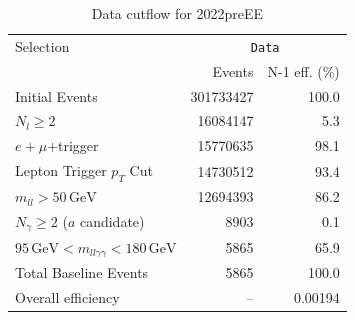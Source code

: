 \begin{table}[htbp]
\centering
\caption{Data cutflow for 2022preEE}
\label{tab:cutflow-data-2022preee}
\footnotesize
\begin{tabular}{lrr}
\hline
Selection & \multicolumn{2}{c}{\texttt{Data}} \\
 & Events & N-1 eff. (\%) \\
\hline
Initial Events & 301733427 & 100.0 \\
$N_{l}\geq 2$ & 16084147 & 5.3 \\
$e+\mu$+trigger & 15770635 & 98.1 \\
Lepton Trigger $p_T$ Cut & 14730512 & 93.4 \\
$m_{ll} > 50\,\mathrm{GeV}$ & 12694393 & 86.2 \\
$N_{\gamma}\geq 2$ ($a$ candidate) & 8903 & 0.1 \\
$95\,\mathrm{GeV} < m_{ll\gamma\gamma} < 180\,\mathrm{GeV}$ & 5865 & 65.9 \\
Total Baseline Events & 5865 & 100.0 \\
\hline
Overall efficiency & -- & 0.00194 \\
\hline
\end{tabular}
\end{table}

